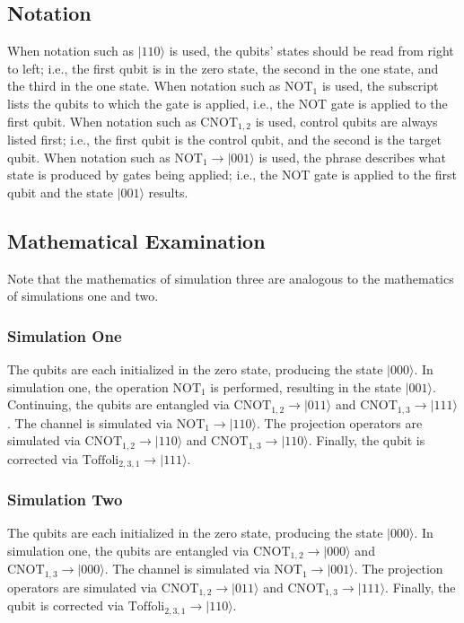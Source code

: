 \documentclass{article}
\begin{document}
\subsection{Notation}
When notation such as $|110\rangle$ is used, the qubits' states should be read from right to left; i.e., the first qubit is in the zero state, the second in the one state, and the third in the one state. 
When notation such as $\mathrm{NOT}_1$ is used, the subscript lists the qubits to which the gate is applied, i.e., the NOT gate is applied to the first qubit. 
When notation such as $\mathrm{CNOT}_{\mathrm{1,2}}$ is used, control qubits are always listed first; i.e., the first qubit is the control qubit, and the second is the target qubit. 
When notation such as $\mathrm{NOT}_1\to|001\rangle$ is used, the phrase describes what state is produced by gates being applied; i.e., the NOT gate is applied to the first qubit and the state $|001\rangle$ results.

\subsection{Mathematical Examination}
Note that the mathematics of simulation three are analogous to the mathematics of simulations one and two.
\subsubsection{Simulation One}
The qubits are each initialized in the zero state, producing the state $|000\rangle$. In simulation one, the operation $\mathrm{NOT}_1$ is performed, resulting in the state $|001\rangle$. Continuing, the qubits are entangled via $\mathrm{CNOT}_{1,2}\to|011\rangle$ and $\mathrm{CNOT}_{1,3}\to|111\rangle$. The channel is simulated via $\mathrm{NOT}_1\to|110\rangle$. The projection operators are simulated via $\mathrm{CNOT}_{1,2}\to|110\rangle$ and $\mathrm{CNOT}_{1,3}\to|110\rangle$. Finally, the qubit is corrected via $\mathrm{Toffoli}_{2,3,1}\to|111\rangle$.

\subsubsection{Simulation Two}
The qubits are each initialized in the zero state, producing the state $|000\rangle$. In simulation one, the qubits are entangled via $\mathrm{CNOT}_{1,2}\to|000\rangle$ and $\mathrm{CNOT}_{1,3}\to|000\rangle$. The channel is simulated via $\mathrm{NOT}_1\to|001\rangle$. The projection operators are simulated via $\mathrm{CNOT}_{1,2}\to|011\rangle$ and $\mathrm{CNOT}_{1,3}\to|111\rangle$. Finally, the qubit is corrected via $\mathrm{Toffoli}_{2,3,1}\to|110\rangle$.
\end{document}
